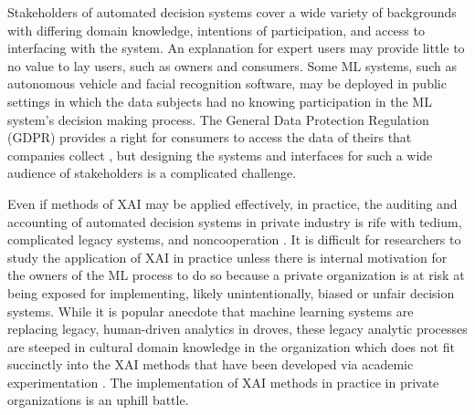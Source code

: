 Stakeholders of automated decision systems cover a wide variety of backgrounds with differing domain knowledge, intentions of participation, and access to interfacing with the system.  An explanation for expert users may provide little to no value to lay users, such as owners and consumers.  Some ML systems, such as autonomous vehicle and facial recognition software, may be deployed in public settings in which the data subjects had no knowing participation in the ML system's decision making process.  The General Data Protection Regulation (GDPR) provides a right for consumers to access the data of theirs that companies collect \cite{Mittelstadt2017}, but designing the systems and interfaces for such a wide audience of stakeholders is a complicated challenge.

Even if methods of XAI may be applied effectively, in practice, the auditing and accounting of automated decision systems in private industry is rife with tedium, complicated legacy systems, and noncooperation \cite{Veale:2018:FAD:3173574.3174014}.  It is difficult for researchers to study the application of XAI in practice unless there is internal motivation for the owners of the ML process to do so because a private organization is at risk at being exposed for implementing, likely unintentionally, biased or unfair decision systems.  While it is popular anecdote that machine learning systems are replacing legacy, human-driven analytics in droves, these legacy analytic processes are steeped in cultural domain knowledge in the organization which does not fit succinctly into the XAI methods that have been developed via academic experimentation \cite{Veale:2018:FAD:3173574.3174014}.  The implementation of XAI methods in practice in private organizations is an uphill battle.
